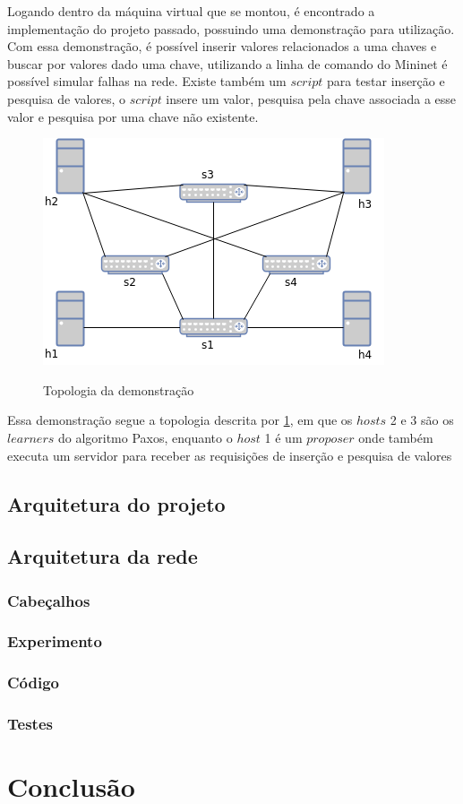 \documentclass[12pt,
openright, 
oneside,
a4paper,
brazil]{facom-ufu-abntex2}
\theoremstyle{definition}
\begin{document}
Logando dentro da máquina virtual que se montou, é encontrado a implementação do projeto
passado, possuindo uma demonstração para utilização. Com essa demonstração, é possível
inserir valores relacionados a uma chaves e buscar por valores dado uma chave, utilizando
a linha de comando do Mininet é possível simular falhas na rede. Existe também um $script$
para testar inserção e pesquisa de valores, o $script$ insere um valor, pesquisa pela chave
associada a esse valor e pesquisa por uma chave não existente.

\begin{figure}[h]
    \caption{Topologia da demonstração}
    \centering
    \includegraphics[scale=0.8]{images/demo-topo.png}
    \label{fig:demo-topo}
\end{figure}

Essa demonstração segue a topologia descrita por \ref{fig:demo-topo}, em que os
$hosts$ 2 e 3 são os $learners$ do algoritmo Paxos, enquanto o $host$ 1 é um
$proposer$ onde também executa um servidor para receber as requisições de 
inserção e pesquisa de valores


\subsection{Arquitetura do projeto}
\subsection{Arquitetura da rede}
\subsubsection{Cabeçalhos}
\subsubsection{Experimento}
\subsubsection{Código}
\subsubsection{Testes}

\section{Conclusão}





\end{document}

